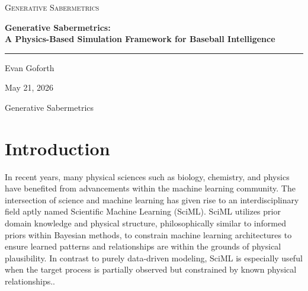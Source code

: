 \documentclass[11pt]{article}
\begin{document}
\begin{titlepage}
    \centering

    \vspace*{1.3in}

    {\Large\scshape Generative Sabermetrics \par}

    \vspace{0.85in}

    {\Huge\bfseries Generative Sabermetrics:\\[0.25em]
    A Physics-Based Simulation Framework for Baseball Intelligence\par}

    \vspace{0.75in}

    \rule{0.72\textwidth}{0.4pt}

    \vspace{0.45in}

    {\large
    Evan Goforth
    \par}

    \vspace{0.35in}

    {\large May 21, 2026 \par}

    \vfill

    {\small
    Generative Sabermetrics
    \par}

\end{titlepage}

\newpage

\section{Introduction}

In recent years, many physical sciences such as biology, chemistry, and physics have benefited from advancements within the machine learning community. The intersection of science and machine learning has given rise to an interdisciplinary field aptly named Scientific Machine Learning (SciML). 
SciML utilizes prior domain knowledge and physical structure, philosophically similar to informed priors within Bayesian methods, to constrain machine learning architectures to ensure learned patterns and relationships are within the grounds of physical plausibility. In contrast to purely data-driven modeling, SciML is especially useful when the target process is partially observed but constrained by known physical relationships.\citep{karniadakis2021physicsinformed, willard2022integrating, karpatne2017theoryguided}.
\end{document}
